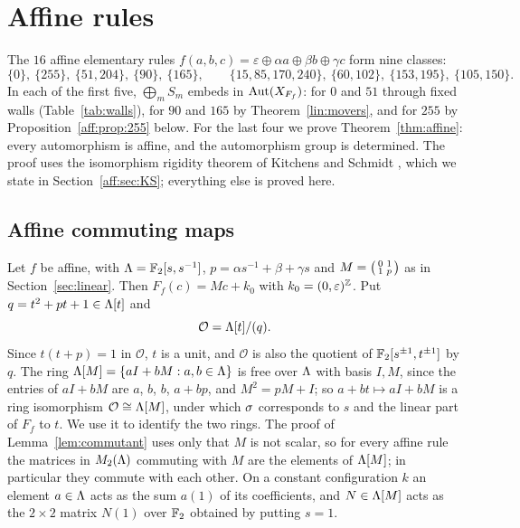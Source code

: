 \section{Affine rules}\label{sec:affine}

The $16$ affine elementary rules $f(a,b,c)=\varepsilon\oplus\alpha a\oplus\beta b\oplus\gamma c$ form nine classes:
\[
\{0\},\ \{255\},\ \{51,204\},\ \{90\},\ \{165\},\qquad \{15,85,170,240\},\ \{60,102\},\ \{153,195\},\ \{105,150\}.
\]
In each of the first five, $\bigoplus_mS_m$ embeds in $\operatorname{Aut}(X_{F_f})$: for $0$ and $51$ through fixed walls (Table~\ref{tab:walls}), for $90$ and $165$ by Theorem~\ref{lin:movers}, and for $255$ by Proposition~\ref{aff:prop:255} below. For the last four we prove Theorem~\ref{thm:affine}: every automorphism is affine, and the automorphism group is determined. The proof uses the isomorphism rigidity theorem of Kitchens and Schmidt \cite{KS2000}, which we state in Section~\ref{aff:sec:KS}; everything else is proved here.

\subsection{Affine commuting maps}\label{aff:sec:setting}

Let $f$ be affine, with $\Lambda=\mathbb{F}_2[s,s^{-1}]$, $p=\alpha s^{-1}+\beta+\gamma s$ and $M=\begin{psmallmatrix}0&1\\1&p\end{psmallmatrix}$ as in Section~\ref{sec:linear}. Then $F_f(c)=Mc+k_0$ with $k_0=(0,\varepsilon)^{\mathbb{Z}}$. Put $q=t^2+pt+1\in\Lambda[t]$ and
\[
\mathcal O=\Lambda[t]/(q).
\]
Since $t(t+p)=1$ in $\mathcal O$, $t$ is a unit, and $\mathcal O$ is also the quotient of $\mathbb{F}_2[s^{\pm1},t^{\pm1}]$ by $q$. The ring $\Lambda[M]=\{aI+bM:a,b\in\Lambda\}$ is free over $\Lambda$ with basis $I,M$, since the entries of $aI+bM$ are $a$, $b$, $b$, $a+bp$, and $M^2=pM+I$; so $a+bt\mapsto aI+bM$ is a ring isomorphism $\mathcal O\cong\Lambda[M]$, under which $\sigma$ corresponds to $s$ and the linear part of $F_f$ to $t$. We use it to identify the two rings. The proof of Lemma~\ref{lem:commutant} uses only that $M$ is not scalar, so for every affine rule the matrices in $M_2(\Lambda)$ commuting with $M$ are the elements of $\Lambda[M]$; in particular they commute with each other. On a constant configuration $k$ an element $a\in\Lambda$ acts as the sum $a(1)$ of its coefficients, and $N\in\Lambda[M]$ acts as the $2\times2$ matrix $N(1)$ over $\mathbb{F}_2$ obtained by putting $s=1$.

